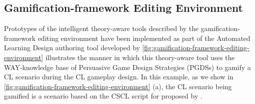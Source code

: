 










\subsection{Gamification-framework Editing Environment}
\label{subsec:editing-ald-tool}

Prototypes of the intelligent theory-aware tools described by the gamification-framework editing environment have been implemented as part of the Automated Learning Design authoring tool developed by 
\autoref{fig:gamification-framework-editing-environment} illustrates the manner in which this theory-aware tool uses the WAY-knowledge base of Persuasive Game Design Strategies (PGDSs) to gamify a CL scenario during the CL gameplay design.
In this example, as we show in \autoref{fig:gamification-framework-editing-environment} (a), the CL scenario being
gamified is a scenario based on the CSCL script for  proposed by .

